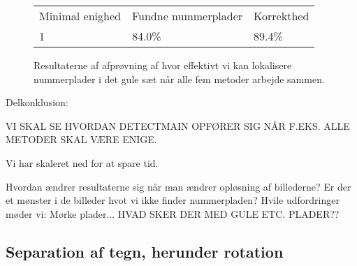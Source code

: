 \begin{figure}[htp]
\centering
  \begin{tabular}{|l|l|l|}
    \hline
    \rowcolor[gray]{0.9} \multicolumn{3}{|>{\columncolor[gray]{0.9}}c|}{\textbf{Gult sæt}} \\
    \hline
    Minimal enighed & Fundne nummerplader & Korrekthed\\ \hline
    1 &  84.0\% & 89.4\%\\ \hline
  \end{tabular}
\caption{Resultaterne af afprøvning af hvor effektivt vi kan lokalisere nummerplader i det gule sæt når alle fem metoder arbejde sammen.}
\label{fig:test:lokalisering_gul_samlet}
\end{figure}



\begin{comment} %
\subsubsection*{Observeret sæt på 407 billeder}
Scale: 0.25
DetectMain: 96.6/99.24
DetectQuant: 67.8/75.4
DetectSameness: 56.8/95.5
DetectContrastAvg: 62.7/85.0
DetectPlateness: 50.4/65.5
DetectCStretch: 84.0/92.7

Scale: 0.50 (Ekstremt langsomt)
DetectPlateness: 29.7/56.5
DetectCStretch:
\end{comment}


Delkonklusion:

VI SKAL SE HVORDAN DETECTMAIN OPFØRER SIG NÅR F.EKS. ALLE METODER SKAL VÆRE ENIGE.

Vi har skaleret ned for at spare tid.

Hvordan ændrer resultaterne sig når man ændrer opløsning af billederne?
Er der et mønster i de billeder hvot vi ikke finder nummerpladen? Hvile udfordringer møder vi: Mørke plader... 
HVAD SKER DER MED GULE ETC. PLADER??



\subsection{Separation af tegn, herunder rotation}

